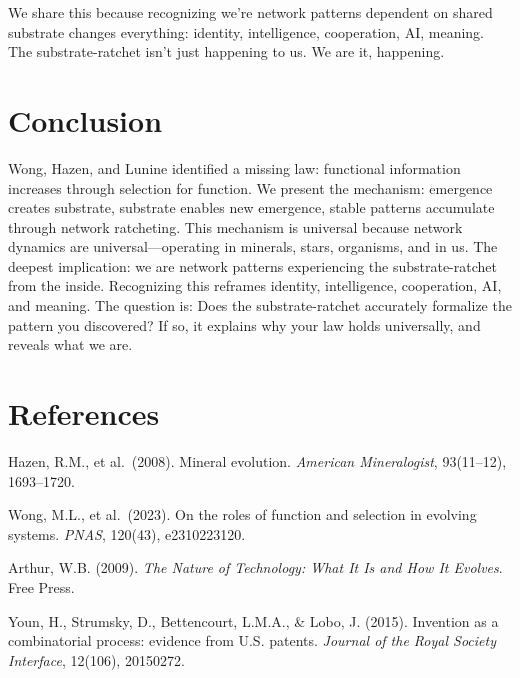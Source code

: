 \documentclass[12pt,a4paper]{article}
\begin{document}
We share this because recognizing we're network patterns dependent on shared substrate changes everything: identity, intelligence, cooperation, AI, meaning. The substrate-ratchet isn't just happening to us. We are it, happening.

\section{Conclusion}

Wong, Hazen, and Lunine identified a missing law: functional information increases through selection for function. We present the mechanism: emergence creates substrate, substrate enables new emergence, stable patterns accumulate through network ratcheting. This mechanism is universal because network dynamics are universal---operating in minerals, stars, organisms, and in us. The deepest implication: we are network patterns experiencing the substrate-ratchet from the inside. Recognizing this reframes identity, intelligence, cooperation, AI, and meaning. The question is: Does the substrate-ratchet accurately formalize the pattern you discovered? If so, it explains why your law holds universally, and reveals what we are.

\section*{References}

Hazen, R.M., et al.\ (2008). Mineral evolution. \emph{American Mineralogist}, 93(11--12), 1693--1720.

Wong, M.L., et al.\ (2023). On the roles of function and selection in evolving systems. \emph{PNAS}, 120(43), e2310223120.

\medskip
\noindent
Arthur, W.B. (2009). \emph{The Nature of Technology: What It Is and How It Evolves}. Free Press.

\medskip
\noindent
Youn, H., Strumsky, D., Bettencourt, L.M.A., \& Lobo, J. (2015). Invention as a combinatorial process: evidence from U.S. patents. \emph{Journal of the Royal Society Interface}, 12(106), 20150272.
\end{document}
